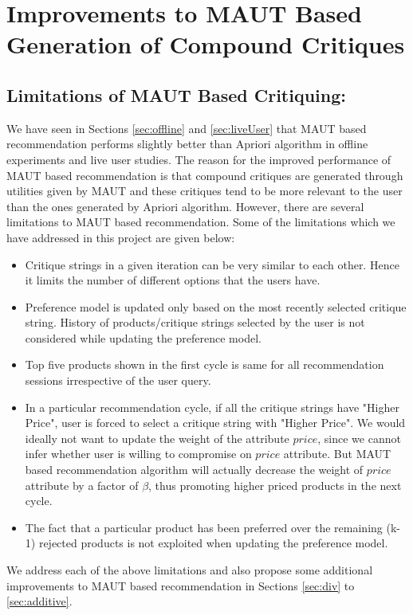 \chapter{Improvements to MAUT Based Generation of Compound Critiques}
\label{chap:modifications}
\section{Limitations of MAUT Based Critiquing:}
\label{sec:limitations}

We have seen in Sections \ref{sec:offline} and \ref{sec:liveUser} that MAUT based recommendation performs slightly better than Apriori algorithm in offline experiments and live user studies.
The reason for the improved performance of MAUT based recommendation is that compound critiques are generated through utilities given by MAUT and these critiques tend to be more relevant to the user than the ones generated by Apriori algorithm.
However, there are several limitations to MAUT based recommendation. Some of the limitations which we have addressed in this project are given below:
\begin{itemize}
\setlength{\itemsep}{5pt}
\item Critique strings in a given iteration can be very similar to each other. Hence it limits the number of different options that the users have.
\item Preference model is updated only based on the most recently selected critique string. History of products/critique strings selected by the user is not considered while updating the preference model.
\item Top five products shown in the first cycle is same for all recommendation sessions irrespective of the user query.
\item In a particular recommendation cycle, if all the critique strings have "Higher Price", user is forced to select a critique string with "Higher Price". We would ideally not want to update the weight of the attribute $price$, since we cannot infer whether user is willing to compromise on $price$ attribute. But MAUT based recommendation algorithm will actually decrease the weight of $price$ attribute by a factor of $\beta$, thus promoting higher priced products in the next cycle.
\item The fact that a particular product has been preferred over the remaining (k-1) rejected products is not exploited when updating the preference model.

\end{itemize}
We address each of the above limitations and also propose some additional improvements to MAUT based recommendation in Sections \ref{sec:div} to \ref{sec:additive}.













